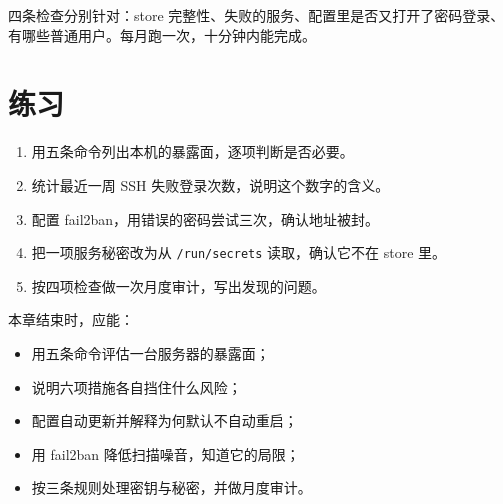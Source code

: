 
四条检查分别针对：store 完整性、失败的服务、配置里是否又打开了密码登录、有哪些普通用户。每月跑一次，十分钟内能完成。

\section{练习}

\begin{enumerate}
  \item 用五条命令列出本机的暴露面，逐项判断是否必要。
  \item 统计最近一周 SSH 失败登录次数，说明这个数字的含义。
  \item 配置 fail2ban，用错误的密码尝试三次，确认地址被封。
  \item 把一项服务秘密改为从 \texttt{/run/secrets} 读取，确认它不在 store 里。
  \item 按四项检查做一次月度审计，写出发现的问题。
\end{enumerate}

\begin{checkpoint}
本章结束时，应能：
\begin{itemize}
  \item 用五条命令评估一台服务器的暴露面；
  \item 说明六项措施各自挡住什么风险；
  \item 配置自动更新并解释为何默认不自动重启；
  \item 用 fail2ban 降低扫描噪音，知道它的局限；
  \item 按三条规则处理密钥与秘密，并做月度审计。
\end{itemize}
\end{checkpoint}
